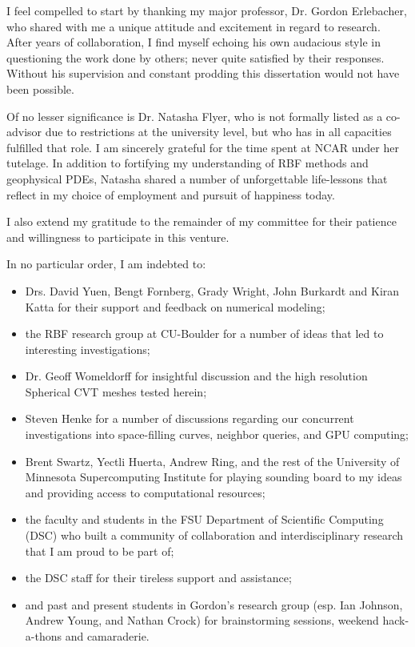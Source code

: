 \begin{acknowledgments}

I feel compelled to start by thanking my major professor, Dr. Gordon Erlebacher, who shared with me a unique attitude and excitement in regard to research. After years of collaboration, I find myself echoing his own audacious style in questioning the work done by others; never quite satisfied by their responses. Without his supervision and constant prodding this dissertation would not have been possible. %

Of no lesser significance is Dr. Natasha Flyer, who is not formally listed as a co-advisor due to restrictions at the university level, but who has in all capacities fulfilled that role. I am sincerely grateful for the time spent at NCAR under her tutelage. In addition to fortifying my understanding of RBF methods and geophysical PDEs, Natasha shared a number of unforgettable life-lessons that reflect in my choice of employment and pursuit of happiness today. 

I also extend my gratitude to the remainder of my committee for their patience and willingness to participate in this venture. 

In no particular order, I am indebted to:
\begin{itemize}
\item Drs. David Yuen, Bengt Fornberg, Grady Wright, John Burkardt and Kiran Katta for their support and feedback on numerical modeling;
\item the RBF research group at CU-Boulder for a number of ideas that led to interesting investigations;
\item Dr. Geoff Womeldorff for insightful discussion and the high resolution Spherical CVT meshes tested herein;
\item Steven Henke for a number of discussions regarding our concurrent investigations into space-filling curves, neighbor queries, and GPU computing;
\item Brent Swartz, Yectli Huerta, Andrew Ring, and the rest of the University of Minnesota Supercomputing Institute for playing sounding board to my ideas and providing access to computational resources;
\item the faculty and students in the FSU Department of Scientific Computing (DSC) who built a community of collaboration and interdisciplinary research that I am proud to be part of;
\item the DSC staff for their tireless support and assistance;  
\item and past and present students in Gordon's research group (esp. Ian Johnson, Andrew Young, and Nathan Crock) for brainstorming sessions, weekend hack-a-thons and camaraderie.
\end{itemize}


\end{acknowledgments}
